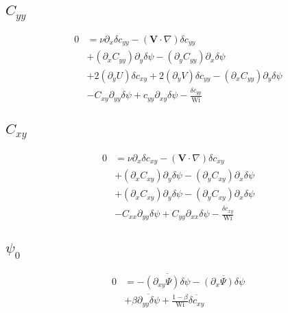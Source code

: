 \documentclass[12,a4paper]{article}
\newcommand{\dd}[1]{\partial_{#1}}
\newcommand{\scyy}{\delta c_{yy}}
\newcommand{\scxy}{\delta c_{xy}}
\newcommand{\spsi}{\delta \psi}
\newcommand{\Wi}{\mathrm{Wi}}
\begin{document}
\subsection{$C_{yy}$}

\begin{align}
    0 &= \nu \dd{x} \scyy - (\mathbf{V}\cdot \nabla) \scyy \nonumber \\
    &+ (\dd{x}C_{yy})\dd{y}\spsi - (\dd{y}C_{yy})\dd{x} \spsi \nonumber\\
    &+ 2(\dd{y}U)\scxy + 2(\dd{y}V)\scyy - (\dd{x}C_{yy})\dd{y}\spsi \nonumber \\
    &- C_{xy}\dd{yy}\spsi + c_{yy}\dd{xy} \spsi - \frac{\scyy}{\Wi} 
\end{align}

\subsection{$C_{xy}$}

\begin{align}
    0 &= \nu \dd{x} \scxy - (\mathbf{V}\cdot \nabla) \scxy \nonumber \\
    &+ (\dd{x}C_{xy})\dd{y}\spsi - (\dd{y}C_{xy})\dd{x} \spsi \nonumber\\
    &+ (\dd{x}C_{xy})\dd{y}\spsi - (\dd{y}C_{xy})\dd{x} \spsi \nonumber \\
    &- C_{xx}\dd{yy} \spsi + C_{yy} \dd{xx} \spsi - \frac{\scxy}{\Wi}
\end{align}

\subsection{$\psi_{0}$}

\begin{align}
    0 &= - \overline{(\dd{xy}\Psi) \spsi} - \overline{(\dd{x}\Psi) \spsi} \nonumber \\
    &+ \beta \overline{\dd{yy}\spsi} + \frac{1-\beta}{\Wi} \overline{\scxy}
\end{align}
\end{document}
